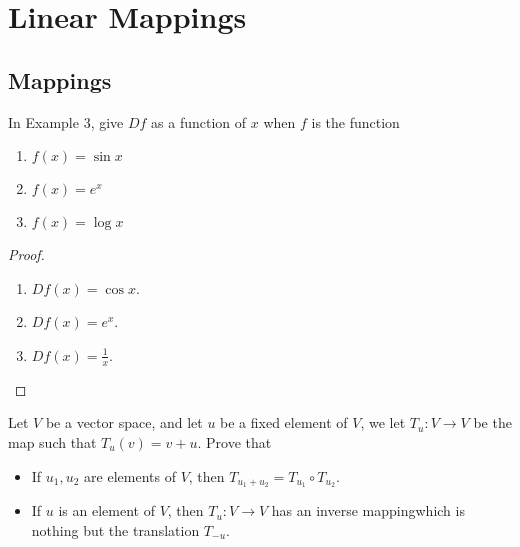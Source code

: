 \chapter{Linear Mappings}

\section{Mappings}
\setcounter{exercise}{0}

\begin{exercise}
    In Example 3, give $Df$ as a function of $x$ when $f$ is the function
    \begin{enumerate}[label={(\alph*)}]
        \item $f(x) = \sin x$
        \item $f(x) = e^{x}$
        \item $f(x) = \log x$
    \end{enumerate}
\end{exercise}

\begin{proof}
    \begin{enumerate}[label={(\alph*)}]
        \item $Df(x) = \cos x$.
        \item $Df(x) = e^{x}$.
        \item $Df(x) = \frac{1}{x}$.
    \end{enumerate}
\end{proof}

\begin{exercise}
    Let $V$ be a vector space, and let $u$ be a fixed element of $V$, we let $T_{u}: V\to V$ be the map such that $T_{u}(v) = v + u$. Prove that
    \begin{itemize}
        \item If $u_{1}, u_{2}$ are elements of $V$, then $T_{u_{1} + u_{2}} = T_{u_{1}} \circ T_{u_{2}}$.
        \item If $u$ is an element of $V$, then $T_{u}: V\to V$ has an inverse mappingwhich is nothing but the translation $T_{-u}$.
    \end{itemize}
\end{exercise}

